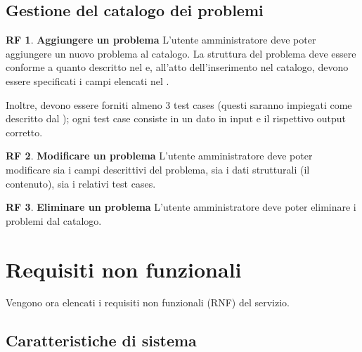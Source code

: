\documentclass[11pt, a4paper]{article}
\theoremstyle{definition}
\newtheorem{funcreq}{RF} %
\begin{document}
\subsection{Gestione del catalogo dei problemi}\label{gestcatalogo}

\begin{funcreq}
\textbf{Aggiungere un problema }
L'utente amministratore deve poter aggiungere un nuovo problema al catalogo.
La struttura del problema deve essere conforme a quanto descritto nel
\textcolor{blue}{}
e, all'atto dell'inserimento nel catalogo, devono essere specificati i campi
elencati nel \textcolor{blue}{}.

Inoltre, devono essere forniti almeno 3 test cases (questi saranno impiegati
come descritto dal \textcolor{blue}{});
ogni test case consiste in un dato in input e il rispettivo output corretto.
\end{funcreq}

\begin{funcreq}
\textbf{Modificare un problema }
L'utente amministratore deve poter modificare sia i campi descrittivi del
problema, sia i dati strutturali (il contenuto), sia i relativi test cases.
\end{funcreq}

\begin{funcreq}
\textbf{Eliminare un problema }
L'utente amministratore deve poter eliminare i problemi dal catalogo.
\end{funcreq}

\newpage
\section{Requisiti non funzionali}
Vengono ora elencati i requisiti non funzionali (RNF) del servizio.

\subsection{Caratteristiche di sistema}
\end{document}

